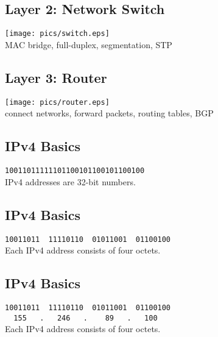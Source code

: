 \documentclass[xga]{xdvislides}
\begin{document}
\subsection{Layer 2: Network Switch}
\vspace*{\fill}
\begin{center}
	\texttt{[image: pics/switch.eps]} \\
	MAC bridge, full-duplex, segmentation, STP
\end{center}
\vspace*{\fill}

\subsection{Layer 3: Router}
\vspace*{\fill}
\begin{center}
	\texttt{[image: pics/router.eps]} \\
	connect networks, forward packets, routing tables, BGP
\end{center}
\vspace*{\fill}


\subsection{IPv4 Basics}
\vspace{.5in}
\Hugesize
\begin{center}
\verb|10011011111101100101100101100100| \\
\vspace{.5in}
IPv4 addresses are 32-bit numbers.
\end{center}
\Normalsize

\subsection{IPv4 Basics}
\vspace{.5in}
\Hugesize
\begin{center}
\verb|10011011  11110110  01011001  01100100| \\
\vspace{.5in}
Each IPv4 address consists of four octets.
\end{center}
\Normalsize

\subsection{IPv4 Basics}
\vspace{.5in}
\Hugesize
\begin{center}
\verb|10011011  11110110  01011001  01100100| \\

\verb|  155   .   246   .    89   .   100| \\
\vspace{.5in}
Each IPv4 address consists of four octets.
\end{center}
\Normalsize
\end{document}
